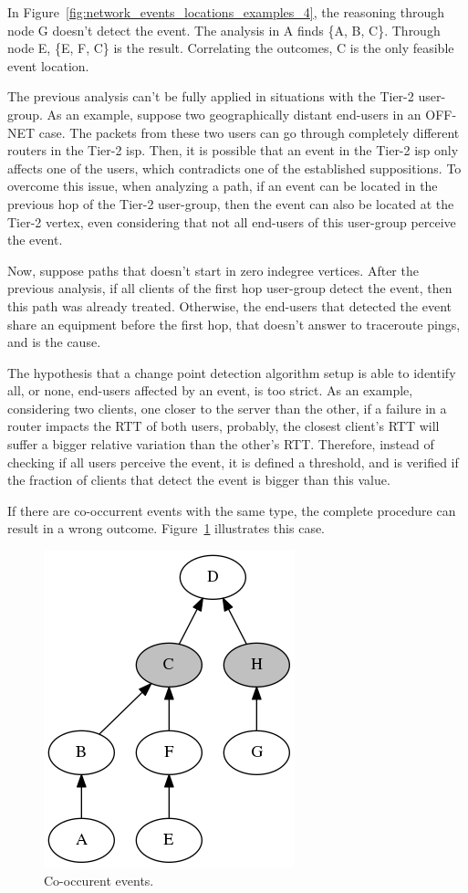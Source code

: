 In Figure~\ref{fig:network_events_locations_examples_4}, the reasoning through
node G doesn't detect the event. The analysis in A finds \{A, B, C\}. Through
node E, \{E, F, C\} is the result.
Correlating the outcomes, C is the only feasible event location.

The previous analysis can't be fully applied in situations with the Tier-2
user-group.
As an example, suppose two geographically distant end-users in an OFF-NET case.
The packets from these two users can go through completely different routers in
the Tier-2 \gls*{isp}. Then, it is possible that an event in the Tier-2 \gls*{isp} only
affects one of the users, which contradicts one of the established suppositions.
To overcome this issue, when analyzing a path, if an event can be located in the
previous hop of the Tier-2 user-group, then the event can also be located at
the Tier-2 vertex, even considering that not all end-users of this user-group
perceive the event.

Now, suppose paths that doesn't start in zero indegree vertices.
After the previous analysis,
if all clients of the first hop user-group detect the event, then this
path was already treated. Otherwise, the end-users that detected the event
share an equipment before the first hop,
that doesn't answer to traceroute pings, and is the cause.

The hypothesis that a change point detection algorithm setup is able to
identify all, or none, end-users affected by an event, is too strict.
As an example, considering two clients, one closer to the server than the
other, if a failure in a router impacts the RTT of both users, probably,
the closest client's RTT will suffer a bigger relative variation than the
other's RTT\@.
Therefore, instead of checking if all users perceive the event,
it is defined a threshold, and is verified if the fraction of clients
that detect the event is bigger than this value.

If there are co-occurrent events with the same type, the complete procedure can
result in a wrong outcome. Figure~\ref{fig:network_events_locations_examples_5}
illustrates this case.

\begin{figure}[H]
    \centering
    \includegraphics[width=0.35\linewidth]{./figures/methodology/spatial_time_correlation/event_tree_graph_5.png}
    \caption{Co-occurent events.}
\label{fig:network_events_locations_examples_5}
\end{figure}%

